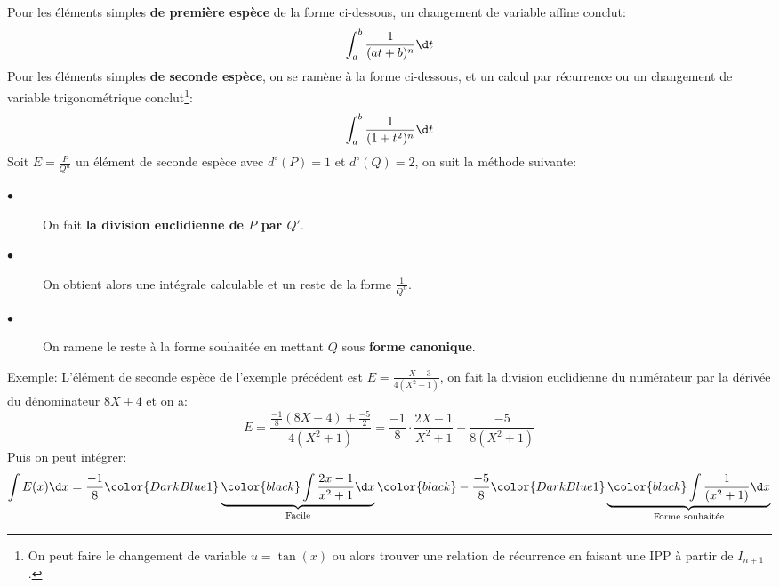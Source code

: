 Pour les éléments simples \textbf{de première espèce} de la forme ci-dessous, un changement de variable affine conclut:
\[
   \int_{a}^{b} \frac{1}{(at+b)^n}  \d t   
\]
Pour les éléments simples \textbf{de seconde espèce}, on se ramène à la forme ci-dessous, et un calcul par récurrence ou un changement de variable trigonométrique conclut\footnote[1]{On peut faire le changement de variable \(u = \tan(x)\) ou alors trouver une relation de récurrence en faisant une IPP à partir de \(I_{n+1}\).}:
\[
   \int_{a}^{b} \frac{1}{(1+t^2)^n}  \d t   
\]
Soit \(E = \frac{P}{Q^n}\) un élément de seconde espèce avec \(d^{\circ}(P) = 1\) et \(d^{\circ}(Q) = 2\), on suit la méthode suivante:\+
\begin{description}
   \item[$\bullet$] On fait \textbf{la division euclidienne de \(P\) par \(Q'\)}.
   \item[$\bullet$] On obtient alors une intégrale calculable et un reste de la forme \(\frac{1}{Q^n}\).
   \item[$\bullet$] On ramene le reste à la forme souhaitée en mettant \(Q\) sous \textbf{forme canonique}.
\end{description}
Exemple: L'élément de seconde espèce de l'exemple précédent est \(E = \frac{-X - 3}{4(X^2+1)}\), on fait la division euclidienne du numérateur par la dérivée du dénominateur \(8X + 4\) et on a:
\[
   E = \frac{\frac{-1}{8}(8X - 4) + \frac{-5}{2}}{4(X^2+1)} =  \frac{-1}{8} \cdot \frac{2X - 1}{X^2+1} - \frac{-5}{8(X^2 +1)}
\]
Puis on peut intégrer:
\[
   \int E(x) \d x = \frac{-1}{8}  \color{DarkBlue1}\underbrace{\color{black} \int \frac{2x - 1}{x^2+1} \d x}_\text{Facile}\color{black}  - \frac{-5}{8} \color{DarkBlue1}\underbrace{\color{black}\int \frac{1}{(x^2 +1)} \d x}_\text{Forme souhaitée}
\]
\pagebreak